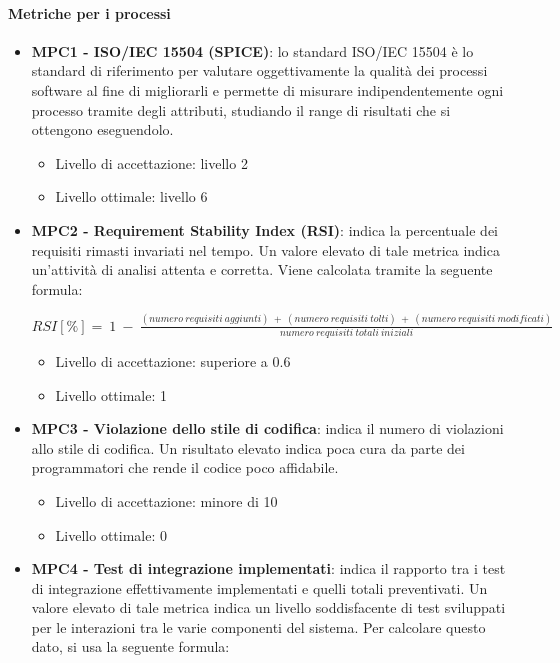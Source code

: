 \documentclass[11pt,a4paper]{article}
\begin{document}
{	\paragraph{Metriche per i processi}
	\begin{itemize}
	 \item \textbf{MPC1 - ISO/IEC 15504 (SPICE)}: lo standard ISO/IEC 15504 è lo standard di riferimento per valutare oggettivamente la qualità dei processi software al fine di migliorarli e permette di misurare indipendentemente ogni processo tramite degli attributi, studiando il range di risultati che si ottengono eseguendolo. 
	 \begin{itemize}
	 \item Livello di accettazione: livello 2
	 \item Livello ottimale: livello 6
	 \end{itemize}
	 \item \textbf{MPC2 - Requirement Stability Index (RSI)}: indica la percentuale dei requisiti rimasti invariati nel tempo. Un valore elevato di tale metrica indica un’attività di analisi attenta e corretta. Viene calcolata tramite la seguente formula:
	 \begin{center}
		$RSI[\%] =\ 1\ -\ \frac{(numero\ requisiti\ aggiunti)\ +\ (numero\ requisiti\ tolti)\ +\ (numero\ requisiti\ modificati)}{numero\ requisiti\ totali\ iniziali}$
	\end{center}
	\begin{itemize}
	 \item Livello di accettazione: superiore a 0.6
	 \item Livello ottimale: 1
	 \end{itemize}
	\item \textbf{MPC3 - Violazione dello stile di codifica}: indica il numero di violazioni allo stile di codifica. Un risultato elevato indica poca cura da parte dei programmatori che rende il codice poco affidabile. 
	\begin{itemize}
	 \item Livello di accettazione: minore di 10
	 \item Livello ottimale: 0
	 \end{itemize}
	\item \textbf{MPC4 - Test di integrazione implementati}: indica il rapporto tra i test di integrazione effettivamente implementati e quelli totali preventivati. Un valore elevato di tale metrica indica un livello soddisfacente di test sviluppati per le interazioni tra le varie componenti del sistema. Per calcolare questo dato, si usa la seguente formula: 

\end{itemize}}
\end{document}
